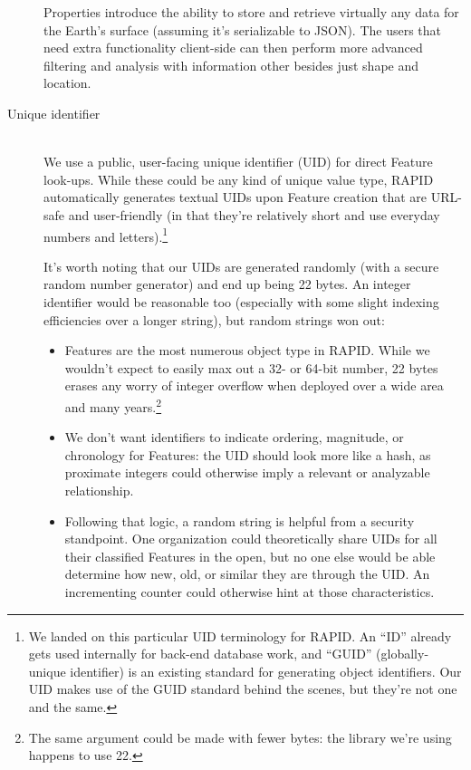 \begin{description}
  Properties introduce the ability to store and retrieve virtually any data for the Earth's surface (assuming it's serializable to JSON). The users that need extra functionality client-side can then perform more advanced filtering and analysis with information other besides just shape and location.
  
  \item[Unique identifier] \hfill \\
  We use a public, user-facing unique identifier (UID) for direct Feature look-ups. While these could be any kind of unique value type, RAPID automatically generates textual UIDs upon Feature creation that are URL-safe and user-friendly (in that they're relatively short and use everyday numbers and letters).\footnote{We landed on this particular UID terminology for RAPID. An ``ID'' already gets used internally for back-end database work, and ``GUID'' (globally-unique identifier) is an existing standard for generating object identifiers. Our UID makes use of the GUID standard behind the scenes, but they're not one and the same.}
  
  It's worth noting that our UIDs are generated randomly (with a secure random number generator) and end up being 22 bytes. An integer identifier would be reasonable too (especially with some slight indexing efficiencies over a longer string), but random strings won out:
  
  \begin{itemize}
  \item Features are the most numerous object type in RAPID. While we wouldn't expect to easily max out a 32- or 64-bit number, 22 bytes erases any worry of integer overflow when deployed over a wide area and many years.\footnote{The same argument could be made with fewer bytes: the library we're using happens to use 22.}
  \item We don't want identifiers to indicate ordering, magnitude, or chronology for Features: the UID should look more like a hash, as proximate integers could otherwise imply a relevant or analyzable relationship.
  \item Following that logic, a random string is helpful from a security standpoint. One organization could theoretically share UIDs for all their classified Features in the open, but no one else would be able determine how new, old, or similar they are through the UID. An incrementing counter could otherwise hint at those characteristics.
\end{itemize}
  

\end{description}
